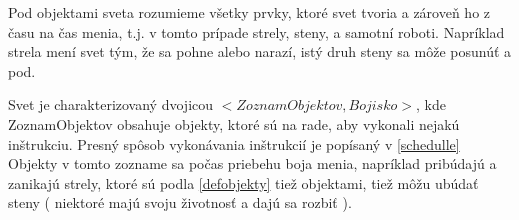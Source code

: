 \begin{definicia} 
Pod objektami sveta rozumieme všetky prvky, ktoré svet tvoria a zároveň ho z času na čas menia, t.j. v tomto prípade strely, steny, a samotní roboti. Napríklad strela mení svet tým, že sa pohne alebo narazí, istý druh steny sa môže posunúť a pod.
\end{definicia}
Svet je charakterizovaný dvojicou $< ZoznamObjektov, Bojisko >$, kde ZoznamObjektov obsahuje objekty, ktoré sú na rade, aby vykonali nejakú inštrukciu. Presný spôsob vykonávania inštrukcií je popísaný v \ref{schedulle} Objekty v tomto zozname sa počas priebehu boja menia, napríklad pribúdajú a zanikajú strely, ktoré sú podla \ref{defobjekty} tiež objektami, tiež môžu ubúdať steny ( niektoré majú svoju životnosť a dajú sa rozbiť ). \\


